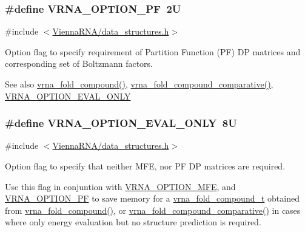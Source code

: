 \subsubsection[{V\+R\+N\+A\+\_\+\+O\+P\+T\+I\+O\+N\+\_\+\+P\+F}]{\setlength{\rightskip}{0pt plus 5cm}\#define V\+R\+N\+A\+\_\+\+O\+P\+T\+I\+O\+N\+\_\+\+P\+F~2\+U}\label{group__fold__compound_gabfbadcddda3e74ce7f49035ef8f058f7}


{\ttfamily \#include $<$\hyperlink{data__structures_8h}{Vienna\+R\+N\+A/data\+\_\+structures.\+h}$>$}



Option flag to specify requirement of Partition Function (P\+F) D\+P matrices and corresponding set of Boltzmann factors. 

\begin{DoxySeeAlso}{See also}
\hyperlink{group__fold__compound_ga6601d994ba32b11511b36f68b08403be}{vrna\+\_\+fold\+\_\+compound()}, \hyperlink{group__fold__compound_gad6bacc816af274922b13d947f708aa0c}{vrna\+\_\+fold\+\_\+compound\+\_\+comparative()}, \hyperlink{group__fold__compound_ga61469c423131552c8483229f8b6c7e0e}{V\+R\+N\+A\+\_\+\+O\+P\+T\+I\+O\+N\+\_\+\+E\+V\+A\+L\+\_\+\+O\+N\+L\+Y} 
\end{DoxySeeAlso}
\hypertarget{group__fold__compound_ga61469c423131552c8483229f8b6c7e0e}{}
\subsubsection[{V\+R\+N\+A\+\_\+\+O\+P\+T\+I\+O\+N\+\_\+\+E\+V\+A\+L\+\_\+\+O\+N\+L\+Y}]{\setlength{\rightskip}{0pt plus 5cm}\#define V\+R\+N\+A\+\_\+\+O\+P\+T\+I\+O\+N\+\_\+\+E\+V\+A\+L\+\_\+\+O\+N\+L\+Y~8\+U}\label{group__fold__compound_ga61469c423131552c8483229f8b6c7e0e}


{\ttfamily \#include $<$\hyperlink{data__structures_8h}{Vienna\+R\+N\+A/data\+\_\+structures.\+h}$>$}



Option flag to specify that neither M\+F\+E, nor P\+F D\+P matrices are required. 

Use this flag in conjuntion with \hyperlink{group__fold__compound_gae63be9127fe7dcc1f9bb14f5bb1064ee}{V\+R\+N\+A\+\_\+\+O\+P\+T\+I\+O\+N\+\_\+\+M\+F\+E}, and \hyperlink{group__fold__compound_gabfbadcddda3e74ce7f49035ef8f058f7}{V\+R\+N\+A\+\_\+\+O\+P\+T\+I\+O\+N\+\_\+\+P\+F} to save memory for a \hyperlink{group__fold__compound_ga1b0cef17fd40466cef5968eaeeff6166}{vrna\+\_\+fold\+\_\+compound\+\_\+t} obtained from \hyperlink{group__fold__compound_ga6601d994ba32b11511b36f68b08403be}{vrna\+\_\+fold\+\_\+compound()}, or \hyperlink{group__fold__compound_gad6bacc816af274922b13d947f708aa0c}{vrna\+\_\+fold\+\_\+compound\+\_\+comparative()} in cases where only energy evaluation but no structure prediction is required.

